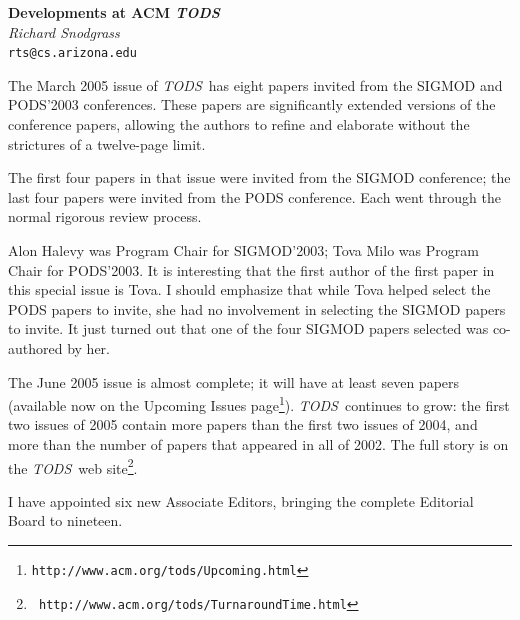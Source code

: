 \documentclass[11pt]{article}
\newcommand{\tods}{{\em TODS\/}}
\begin{document}
\begin{center}
{\Large\bf Developments at ACM {\em TODS}}\\[2ex]
{\large\it  Richard Snodgrass}\\[1ex]
{\tt rts@cs.arizona.edu}\\[3ex]
\end{center}

The March 2005 issue of \tods\ has eight papers invited from the SIGMOD and
PODS'2003 conferences. These papers are significantly extended versions of
the conference papers, allowing the authors to refine and elaborate without
the strictures of a twelve-page limit.

The first four papers in that issue were invited from the SIGMOD conference;
the last four papers were invited from the PODS conference. Each went
through the normal rigorous review process.

Alon Halevy was Program Chair for SIGMOD'2003; Tova Milo was Program Chair
for PODS'2003. It is interesting that the first author of the first paper in
this special issue is Tova. I should emphasize that while Tova helped
select the PODS papers to invite, she had no involvement in selecting the
SIGMOD papers to invite. It just turned out that one of the four SIGMOD
papers selected was co-authored by her.

The June 2005 issue is almost
complete; it will have at least seven papers (available now on the Upcoming
Issues page\footnote{{\tt http://www.acm.org/tods/Upcoming.html}}). \tods\
continues to grow: the first two issues of 2005 contain more papers than
the first two issues of 2004, and more than the number of papers that appeared
in all of 2002. The full story is on the \tods\ web site\footnote{\tt
  http://www.acm.org/tods/TurnaroundTime.html}. 

\vspace{2em}
I have appointed six new Associate Editors, bringing the complete Editorial
Board to nineteen.
\end{document}
